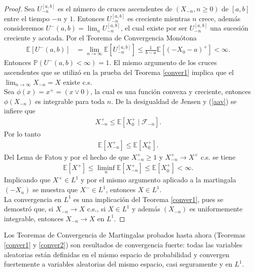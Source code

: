 \begin{proof}
Sea $U_{-n}^{[a, b]}$ es el número de cruces ascendentes de $(X_{-n}, n \geq 0)$ de $[a, b]$ entre el tiempo $-n$ y $1$. Entonces $U_{-n}^{[a, b]}$ es creciente mientras $n$ crece, además consideremos $U^{-}(a, b) = \lim_n U_{-n}^{[a, b]}$, el cual existe por ser $U_{-n}^{[a, b]}$ una sucesión creciente y acotada. Por el Teorema de Convergencia Monótona
	\begin{align*}
	\mathbb{E}[U^{-}(a, b)] & = \lim_{n \rightarrow \infty} \mathbb{E}[U_{-n}^{[a, b]}] \leq \frac{1}{b-a} \mathbb{E}[(-X_0 - a)^{+}] < \infty.
	\end{align*}
Entonces $\mathbb{P}(U^{-}(a, b) < \infty) = 1$. El mismo argumento de los cruces ascendentes que se utilizó en la prueba del Teorema \ref{conver1} implica que el $\lim_{n \rightarrow \infty} X_{-n} = X$ existe c.s. \\

Sea $\phi(x) = x^{+} = (x \vee 0)$, la cual es una función convexa y creciente, entonces $\phi(X_{-n})$ es integrable para toda $n$. De la desigualdad de Jensen y (\ref{aav}) se infiere que 
	\begin{align*}
	X_{-n}^{+} \leq \mathbb{E}[X_0^{+} \mid \mathcal{F}_{-n}].
	\end{align*}
Por lo tanto
	\begin{align*}
	\mathbb{E}[X_{-n}^{+}] \leq \mathbb{E}[X_0^{+}].
	\end{align*}
Del Lema de Fatou y por el hecho de que $X_{-n}^{+} \geq 1$ y $X_{-n}^{+} \rightarrow X^{+}$ c.s. se tiene
	\begin{align*}
	\mathbb{E}[X^{+}] \leq \liminf_n \mathbb{E}[X_{-n}^{+}] \leq \mathbb{E}[X_0^{+}] < \infty.
	\end{align*}
Implicando que $X^{+} \in L^1$ y por el mismo argumento aplicado a la martingala $(-X_n)$ se muestra que $X^{-} \in L^1$, entonces $X \in L^1$. \\

La convergencia en $L^1$ es una implicación del Teorema \ref{conver1}, pues se demostró que, si $X_{-n} \rightarrow X$ c.s., si $X \in L^1$ y además $(X_{-n})$ es uniformemente integrable, entonces $X_{-n} \rightarrow X$ en $L^1$.
\end{proof}

Los Teoremas de Convergencia de Martingalas probados hasta ahora (Teoremas \ref{conver1} y \ref{conver2}) son resultados de convergencia fuerte: todas las variables aleatorias están definidas en el mismo espacio de probabilidad y convergen fuertemente a variables aleatorias del mismo espacio, casi seguramente y en $L^1$. \\ 

